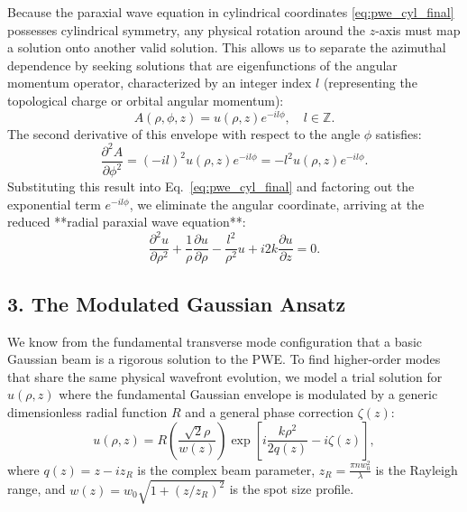\begin{resolucao}[Solution]
        Because the paraxial wave equation in cylindrical coordinates \eqref{eq:pwe_cyl_final} possesses cylindrical symmetry, any physical rotation around the $z$-axis must map a solution onto another valid solution. This allows us to separate the azimuthal dependence by seeking solutions that are eigenfunctions of the angular momentum operator, characterized by an integer index $l$ (representing the topological charge or orbital angular momentum):
        \begin{equation}
            A(\rho, \phi, z) = u(\rho, z) e^{-i l \phi}, \quad l \in \mathbb{Z}.
            \label{eq:azimuthal_sep}
        \end{equation}
        The second derivative of this envelope with respect to the angle $\phi$ satisfies:
        \[
        \frac{\partial^2 A}{\partial \phi^2} = (-i l)^2 u(\rho, z) e^{-i l \phi} = -l^2 u(\rho, z) e^{-i l \phi}.
        \]
        Substituting this result into Eq.~\eqref{eq:pwe_cyl_final} and factoring out the exponential term $e^{-i l \phi}$, we eliminate the angular coordinate, arriving at the reduced **radial paraxial wave equation**:
        \begin{equation}
            \frac{\partial^2 u}{\partial \rho^2} + \frac{1}{\rho}\frac{\partial u}{\partial \rho} - \frac{l^2}{\rho^2}u + i 2k \frac{\partial u}{\partial z} = 0.
            \label{eq:radial_pwe_step}
        \end{equation}

    \subsection*{3. The Modulated Gaussian Ansatz}

        We know from the fundamental transverse mode configuration that a basic Gaussian beam is a rigorous solution to the PWE. To find higher-order modes that share the same physical wavefront evolution, we model a trial solution for $u(\rho, z)$ where the fundamental Gaussian envelope is modulated by a generic dimensionless radial function $R$ and a general phase correction $\zeta(z)$:
        \begin{equation}
            u(\rho, z) = R\left(\frac{\sqrt{2}\rho}{w(z)}\right) \exp\left[ i \frac{k \rho^2}{2 q(z)} - i \zeta(z) \right],
            \label{eq:ansatz_detailed}
        \end{equation}
        where $q(z) = z - i z_R$ is the complex beam parameter, $z_R = \frac{\pi n w_0^2}{\lambda}$ is the Rayleigh range, and $w(z) = w_0 \sqrt{1 + (z/z_R)^2}$ is the spot size profile.
        

\end{resolucao}
